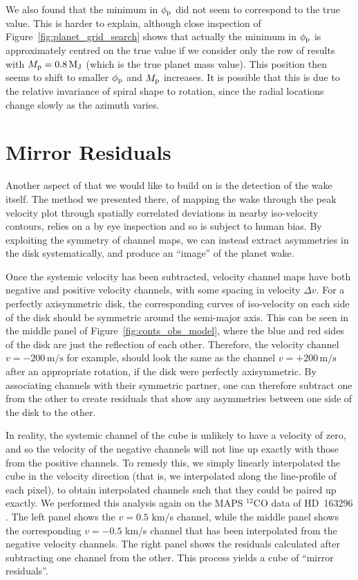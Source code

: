 We also found that the minimum in $\phi_{\rm p}$ did not seem to correspond to the true value.
This is harder to explain, although close inspection of Figure~\ref{fig:planet_grid_search} shows that actually the minimum in $\phi_{\rm p}$ is approximately centred on the true value if we consider only the row of results with $M_{\rm p} = 0.8 \, \mathrm{M_J}$ (which is the true planet mass value).
This position then seems to shift to smaller $\phi_{\rm p}$ and $M_{\rm p}$ increases.
It is possible that this is due to the relative invariance of spiral shape to rotation, since the radial locations change slowly as the azimuth varies.

\section{Mirror Residuals} \label{sec:mirror_residuals}

Another aspect of \citet{calcino2022} that we would like to build on is the detection of the wake itself.
The method we presented there, of mapping the wake through the peak velocity plot through spatially correlated deviations in nearby iso-velocity contours, relies on a by eye inspection and so is subject to human bias.
By exploiting the symmetry of channel maps, we can instead extract asymmetries in the disk systematically, and produce an ``image'' of the planet wake.

Once the systemic velocity has been subtracted, velocity channel maps have both negative and positive velocity channels, with some spacing in velocity $\Delta v$.
For a perfectly axisymmetric disk, the corresponding curves of iso-velocity on each side of the disk should be symmetric around the semi-major axis.
This can be seen in the middle panel of Figure~\ref{fig:conts_obs_model}, where the blue and red sides of the disk are just the reflection of each other.
Therefore, the velocity channel $v=-200 \, \mathrm{m/s}$ for example, should look the same as the channel $v=+200 \, \mathrm{m/s}$ after an appropriate rotation, if the disk were perfectly axisymmetric.
By associating channels with their symmetric partner, one can therefore subtract one from the other to create residuals that show any asymmetries between one side of the disk to the other.

In reality, the systemic channel of the cube is unlikely to have a velocity of zero, and so the velocity of the negative channels will not line up exactly with those from the positive channels.
To remedy this, we simply linearly interpolated the cube in the velocity direction (that is, we interpolated along the line-profile of each pixel), to obtain interpolated channels such that they could be paired up exactly.
We performed this analysis again on the MAPS $^{12}$CO data of HD~163296 \citep{oberg2021}.
The left panel shows the $v=0.5$ km/s channel, while the middle panel shows the corresponding $v=-0.5$ km/s channel that has been interpolated from the negative velocity channels.
The right panel shows the residuals calculated after subtracting one channel from the other.
This process yields a cube of ``mirror residuals''.

